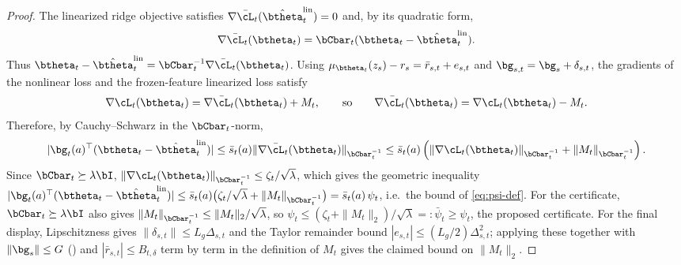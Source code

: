 \begin{proof}
The linearized ridge objective satisfies
$\nabla \bar{\cL}_t(\hat\btheta_t^{\mathrm{lin}})=0$ and, by its
quadratic form,
\[
  \nabla \bar{\cL}_t(\btheta_t)
  =
  \bCbar_t(\btheta_t-\hat\btheta_t^{\mathrm{lin}}).
\]
Thus
$\btheta_t-\hat\btheta_t^{\mathrm{lin}}
=\bCbar_t^{-1}\nabla\bar{\cL}_t(\btheta_t)$.
Using
$\mu_{\btheta_t}(z_s)-r_s=\bar r_{s,t}+e_{s,t}$ and
$\bg_{s,t}=\bg_s+\delta_{s,t}$, the gradients of the nonlinear loss
and the frozen-feature linearized loss satisfy
\[
  \nabla \cL_t(\btheta_t)
  =
  \nabla \bar{\cL}_t(\btheta_t)+M_t,
  \qquad
  \text{so}\qquad
  \nabla \bar{\cL}_t(\btheta_t)=\nabla \cL_t(\btheta_t)-M_t .
\]
Therefore, by Cauchy--Schwarz in the $\bCbar_t$-norm,
\[
  |\bg_t(a)^\top(\btheta_t-\hat\btheta_t^{\mathrm{lin}})|
  \le
  \bar s_t(a)
  \|\nabla \bar{\cL}_t(\btheta_t)\|_{\bCbar_t^{-1}}
  \le
  \bar s_t(a)
  \left(
    \|\nabla \cL_t(\btheta_t)\|_{\bCbar_t^{-1}}
    +
    \|M_t\|_{\bCbar_t^{-1}}
  \right).
\]
Since $\bCbar_t\succeq\lambda\bI$,
$\|\nabla \cL_t(\btheta_t)\|_{\bCbar_t^{-1}}\le \zeta_t/\sqrt{\lambda}$,
which gives the geometric inequality
$|\bg_t(a)^\top(\btheta_t-\hat\btheta_t^{\mathrm{lin}})|
\le\bar s_t(a)\bigl(\zeta_t/\sqrt{\lambda}+\|M_t\|_{\bCbar_t^{-1}}\bigr)
=\bar s_t(a)\,\psi_t$, i.e.\ the bound of \eqref{eq:psi-def}.
For the certificate, $\bCbar_t\succeq\lambda\bI$ also gives
$\|M_t\|_{\bCbar_t^{-1}}\le\|M_t\|_2/\sqrt{\lambda}$, so
$\psi_t\le(\zeta_t+\|M_t\|_2)/\sqrt{\lambda}=:\bar\psi_t\ge\psi_t$, the proposed
certificate.
For the final display, Lipschitzness gives
$\|\delta_{s,t}\|\le L_g\Delta_{s,t}$ and the Taylor remainder bound
$|e_{s,t}|\le (L_g/2)\Delta_{s,t}^2$; applying these together with
$\|\bg_s\|\le G$ () and $|\bar r_{s,t}|\le B_{t,\delta}$
term by term in the definition of $M_t$ gives the claimed bound on $\|M_t\|_2$.
\end{proof}

